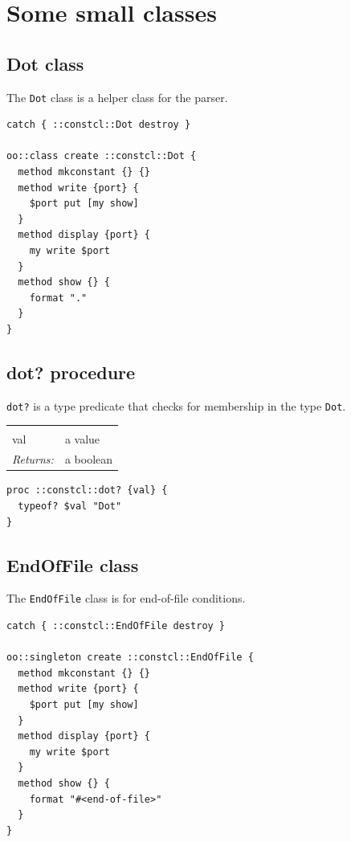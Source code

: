 \documentclass[twoside]{report}
\begin{document}
\section{Some small classes}
\label{some-small-classes}

\subsection{Dot class}
\label{dot-class}

The \texttt{Dot} class is a helper class for the parser.

\begin{lstlisting}
catch { ::constcl::Dot destroy }

oo::class create ::constcl::Dot {
  method mkconstant {} {}
  method write {port} {
    $port put [my show]
  }
  method display {port} {
    my write $port
  }
  method show {} {
    format "."
  }
}
\end{lstlisting}

\subsection{dot? procedure}
\label{dot-procedure}

\texttt{dot?} is a type predicate that checks for membership in the type \texttt{Dot}.

\noindent\begin{tabular}{ |p{1.9cm} p{8cm}| }
\hline
\rowcolor[HTML]{CCCCCC} \multicolumn{2}{|l|}{\bf dot? (internal)} \\
val & a value \\
\textit{Returns:} & a boolean \\
\hline
\end{tabular}

\begin{lstlisting}
proc ::constcl::dot? {val} {
  typeof? $val "Dot"
}
\end{lstlisting}

\subsection{EndOfFile class}
\label{endoffile-class}

The \texttt{EndOfFile} class is for end-of-file conditions.

\begin{lstlisting}
catch { ::constcl::EndOfFile destroy }

oo::singleton create ::constcl::EndOfFile {
  method mkconstant {} {}
  method write {port} {
    $port put [my show]
  }
  method display {port} {
    my write $port
  }
  method show {} {
    format "#<end-of-file>"
  }
}
\end{lstlisting}
\end{document}
